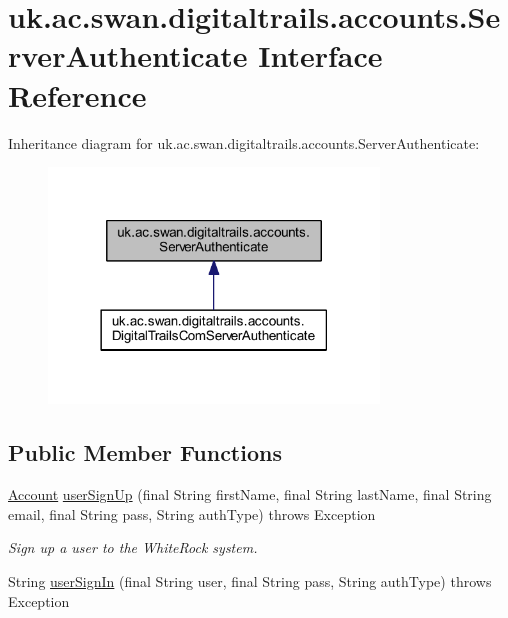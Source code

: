 \hypertarget{interfaceuk_1_1ac_1_1swan_1_1digitaltrails_1_1accounts_1_1_server_authenticate}{\section{uk.\+ac.\+swan.\+digitaltrails.\+accounts.\+Server\+Authenticate Interface Reference}
\label{interfaceuk_1_1ac_1_1swan_1_1digitaltrails_1_1accounts_1_1_server_authenticate}
}


Inheritance diagram for uk.\+ac.\+swan.\+digitaltrails.\+accounts.\+Server\+Authenticate\+:\nopagebreak
\begin{figure}[H]
\begin{center}
\leavevmode
\includegraphics[width=249pt]{interfaceuk_1_1ac_1_1swan_1_1digitaltrails_1_1accounts_1_1_server_authenticate__inherit__graph}
\end{center}
\end{figure}
\subsection*{Public Member Functions}
\begin{DoxyCompactItemize}
\item 
\hyperlink{classuk_1_1ac_1_1swan_1_1digitaltrails_1_1components_1_1_account}{Account} \hyperlink{interfaceuk_1_1ac_1_1swan_1_1digitaltrails_1_1accounts_1_1_server_authenticate_a599563b20b603d67f3e60e7fe5e5bc7b}{user\+Sign\+Up} (final String first\+Name, final String last\+Name, final String email, final String pass, String auth\+Type)  throws Exception
\begin{DoxyCompactList}\small\item\em Sign up a user to the White\+Rock system. \end{DoxyCompactList}\item 
String \hyperlink{interfaceuk_1_1ac_1_1swan_1_1digitaltrails_1_1accounts_1_1_server_authenticate_a570b379af9eda033c2eb74d239f3f8c3}{user\+Sign\+In} (final String user, final String pass, String auth\+Type)  throws Exception
\end{DoxyCompactItemize}


